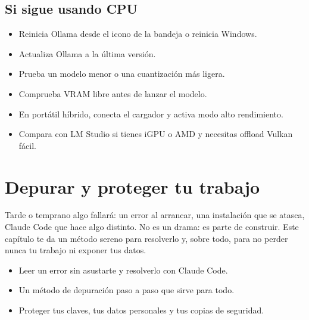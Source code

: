 \documentclass[11pt,a4paper]{book}
\begin{document}
\section{Si sigue usando CPU}
\begin{itemize}\item Reinicia Ollama desde el icono de la bandeja o reinicia Windows.\end{itemize}
\begin{itemize}\item Actualiza Ollama a la última versión.\end{itemize}
\begin{itemize}\item Prueba un modelo menor o una cuantización más ligera.\end{itemize}
\begin{itemize}\item Comprueba VRAM libre antes de lanzar el modelo.\end{itemize}
\begin{itemize}\item En portátil híbrido, conecta el cargador y activa modo alto rendimiento.\end{itemize}
\begin{itemize}\item Compara con LM Studio si tienes iGPU o AMD y necesitas offload Vulkan fácil.\end{itemize}
\chapter{Depurar y proteger tu trabajo}
Tarde o temprano algo fallará: un error al arrancar, una instalación que se atasca, Claude Code que hace algo distinto. No es un drama: es parte de construir. Este capítulo te da un método sereno para resolverlo y, sobre todo, para no perder nunca tu trabajo ni exponer tus datos.

\begin{itemize}\item Leer un error sin asustarte y resolverlo con Claude Code.\end{itemize}
\begin{itemize}\item Un método de depuración paso a paso que sirve para todo.\end{itemize}
\begin{itemize}\item Proteger tus claves, tus datos personales y tus copias de seguridad.\end{itemize}
\end{document}
